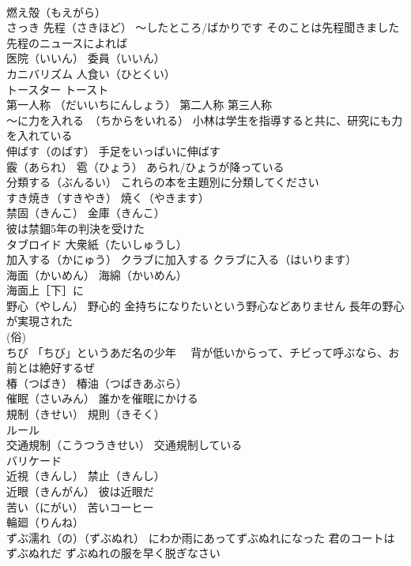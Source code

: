\documentclass[8pt]{extreport}
\begin{document}
\begin{CJK}{UTF8}{min}
\\	燃え殻（もえがら）
\\	さっき 先程（さきほど） ～したところ/ばかりです そのことは先程聞きました 先程のニュースによれば
\\	医院（いいん） 委員（いいん）
\\	カニバリズム 人食い（ひとくい）
\\	トースター トースト
\\	第一人称 （だいいちにんしょう） 第二人称 第三人称
\\	～に力を入れる　（ちからをいれる） 小林は学生を指導すると共に、研究にも力を入れている
\\	伸ばす（のばす） 手足をいっぱいに伸ばす
\\	霰（あられ） 雹（ひょう） あられ/ひょうが降っている
\\	分類する（ぶんるい） これらの本を主題別に分類してください
\\	すき焼き（すきやき） 焼く（やきます）
\\	禁固（きんこ） 金庫（きんこ）
\\	彼は禁錮5年の判決を受けた
\\	タブロイド 大衆紙（たいしゅうし）
\\	加入する（かにゅう） クラブに加入する クラブに入る（はいります）
\\	海面（かいめん） 海綿（かいめん） 
\\	海面上［下］に
\\	野心（やしん） 野心的 金持ちになりたいという野心などありません 長年の野心が実現された
\\	(俗) 
\\	ちび 「ちび」というあだ名の少年　 背が低いからって、チビって呼ぶなら、お前とは絶好するぜ
\\	椿（つばき） 椿油（つばきあぶら）
\\	催眠（さいみん） 誰かを催眠にかける
\\	規制（きせい） 規則（きそく）
\\	ルール 
\\	交通規制（こうつうきせい） 交通規制している
\\	バリケード
\\	近視（きんし） 禁止（きんし）
\\	近眼（きんがん） 彼は近眼だ
\\	苦い（にがい） 苦いコーヒー
\\	輪廻（りんね）
\\	ずぶ濡れ（の）（ずぶぬれ） にわか雨にあってずぶぬれになった 君のコートはずぶぬれだ ずぶぬれの服を早く脱ぎなさい

\end{CJK}
\end{document}
